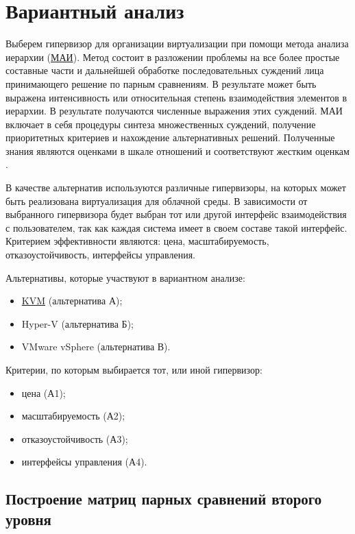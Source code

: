 \section{Вариантный анализ}

Выберем гипервизор для организации виртуализации при помощи метода анализа иерархии (\hyperlink{mai}{МАИ}).
Метод состоит в разложении проблемы на все более простые составные части и дальнейшей обработке последовательных суждений лица принимающего решение по парным сравнениям.
В результате может быть выражена интенсивность или относительная степень взаимодействия элементов в иерархии.
В результате получаются численные выражения этих суждений.
МАИ включает в себя процедуры синтеза множественных суждений, получение приоритетных критериев и нахождение альтернативных решений.
Полученные знания являются оценками в шкале отношений и соответствуют жестким оценкам \cite{var-analyz}.

В качестве альтернатив используются различные гипервизоры, на которых может быть реализована виртуализация для облачной среды.
В зависимости от выбранного гипервизора будет выбран тот или другой интерфейс взаимодействия с пользователем, так как каждая система имеет в своем составе такой интерфейс.
Критерием эффективности являются: цена, масштабируемость, отказоустойчивость, интерфейсы управления.

Альтернативы, которые участвуют в вариантном анализе:
\begin{itemize}
  \item \hyperlink{kvm}{KVM} (альтернатива А);
  \item Hyper-V (альтернатива Б);
  \item VMware vSphere (альтернатива В).
\end{itemize}

Критерии, по которым выбирается тот, или иной гипервизор:
\begin{itemize}
  \item цена (А1);
  \item масштабируемость (А2);
  \item отказоустойчивость (А3);
  \item интерфейсы управления (А4).
\end{itemize}

\subsection{Построение матриц парных сравнений второго уровня}

